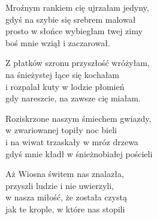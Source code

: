 \begin{text}
    Mroźnym rankiem cię ujrzałam jedyny,\\
    gdyś na szybie się srebrem malował\\
    prosto w słońce wybiegłam twej zimy\\
    boś mnie wziął i zaczarował.

    Z płatków szronu przyszłość wróżyłam,\\
    na śnieżystej łące się kochałam\\
    i rozpalał kuty w lodzie płomień\\
    gdy nareszcie, na zawsze cię miałam.

    Roziskrzone naszym śmiechem gwiazdy,\\
    w zwariowanej topiły noc bieli\\
    i na wiwat trzaskały w mróz drzewa\\
    gdyś mnie kładł w śnieżnobiałej pościeli

    Aż Wiosna świtem nas znalazła,\\
    przyszli ludzie i nie uwierzyli,\\
    w nasza miłość, że została czystą\\
    jak te krople, w które nas stopili
\end{text}
\begin{chord}

\end{chord}
